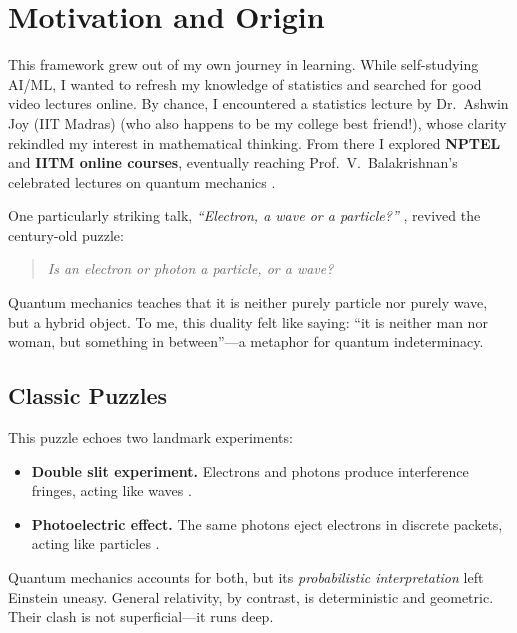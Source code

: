 \section{Motivation and Origin}

This framework grew out of my own journey in learning. While self-studying AI/ML, I
wanted to refresh my knowledge of statistics and searched for good video lectures online.
By chance, I encountered a statistics lecture by Dr.~Ashwin Joy (IIT Madras)
\cite{ashwinjoy_youtube} (who also happens to be my college best friend!), whose clarity rekindled my interest in mathematical thinking.
From there I explored \textbf{NPTEL} and \textbf{IITM online courses}, eventually reaching
Prof.~V.~Balakrishnan’s celebrated lectures on quantum mechanics
\cite{balakrishnan_qm_series}. 

One particularly striking talk, \emph{``Electron, a wave or a particle?''}
\cite{balakrishnan_wave_particle}, revived the century-old puzzle:

\begin{quote}
\emph{Is an electron or photon a particle, or a wave?}
\end{quote}

Quantum mechanics teaches that it is neither purely particle nor purely wave, but a
hybrid object. To me, this duality felt like saying: ``it is neither man nor woman, but
something in between''---a metaphor for quantum indeterminacy.

\subsection{Classic Puzzles}

This puzzle echoes two landmark experiments:

\begin{itemize}
  \item \textbf{Double slit experiment.} Electrons and photons produce interference fringes,
        acting like waves \cite{feynman_double_slit}.
  \item \textbf{Photoelectric effect.} The same photons eject electrons in discrete packets,
        acting like particles \cite{einstein_nobel}.
\end{itemize}

Quantum mechanics accounts for both, but its \emph{probabilistic interpretation} left
Einstein uneasy. General relativity, by contrast, is deterministic and geometric. Their
clash is not superficial---it runs deep.

